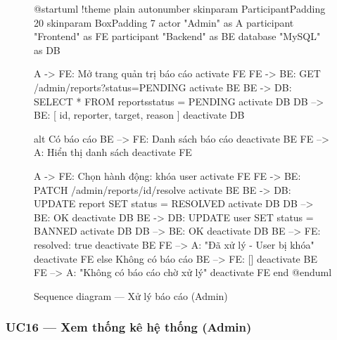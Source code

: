 \documentclass[12pt,a4paper]{report}
\begin{document}
\begin{figure}[H]
    \centering
    \begin{plantuml}
        @startuml
        !theme plain
        autonumber
        skinparam ParticipantPadding 20
        skinparam BoxPadding 7
        actor "Admin" as A
        participant "Frontend" as FE
        participant "Backend" as BE
        database "MySQL" as DB

        A -> FE: Mở trang quản trị báo cáo
        activate FE
        FE -> BE: GET /admin/reports\n?status=PENDING
        activate BE
        BE -> DB: SELECT * FROM reports\nWHERE status = PENDING
        activate DB
        DB --> BE: [{ id, reporter, target, reason }]
        deactivate DB

        alt Có báo cáo
          BE --> FE: Danh sách báo cáo
          deactivate BE
          FE --> A: Hiển thị danh sách
          deactivate FE

          A -> FE: Chọn hành động: khóa user
          activate FE
          FE -> BE: PATCH /admin/reports/{id}/resolve
          activate BE
          BE -> DB: UPDATE report SET status = RESOLVED
          activate DB
          DB --> BE: OK
          deactivate DB
          BE -> DB: UPDATE user SET status = BANNED
          activate DB
          DB --> BE: OK
          deactivate DB
          BE --> FE: { resolved: true }
          deactivate BE
          FE --> A: "Đã xử lý - User bị khóa"
          deactivate FE
        else Không có báo cáo
          BE --> FE: []
          deactivate BE
          FE --> A: "Không có báo cáo chờ xử lý"
          deactivate FE
        end
        @enduml
    \end{plantuml}
    \caption{Sequence diagram --- Xử lý báo cáo (Admin)}
\end{figure}

\subsubsection{UC16 --- Xem thống kê hệ thống (Admin)}
\end{document}
